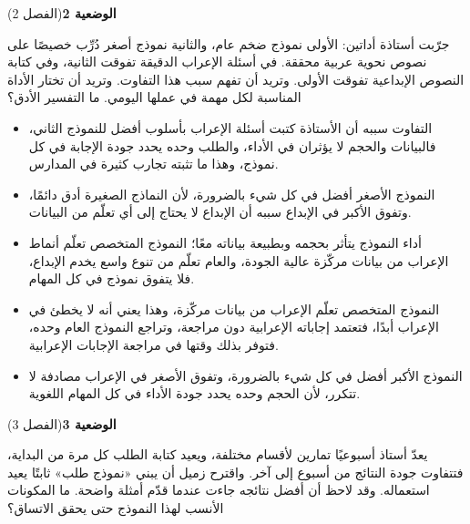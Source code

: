 \documentclass[11pt,a4paper]{article}
\begin{document}
\par\vspace{6pt}
\noindent
{\large\khatt\textbf{الوضعية 2}}\hfill{\small(الفصل 2)}\par\nopagebreak\vspace{3pt}
\setlength{\fboxsep}{7pt}\colorbox{gray!10}{\parbox{\dimexpr\linewidth-14pt}{جرّبت أستاذة أداتين: الأولى نموذج ضخم عام، والثانية نموذج أصغر دُرِّب خصيصًا على نصوص نحوية عربية محققة. في أسئلة الإعراب الدقيقة تفوقت الثانية، وفي كتابة النصوص الإبداعية تفوقت الأولى. وتريد أن تفهم سبب هذا التفاوت. وتريد أن تختار الأداة المناسبة لكل مهمة في عملها اليومي. ما التفسير الأدق؟}}\par\nopagebreak
\begin{itemize}[leftmargin=1.0cm, labelsep=6pt, itemsep=3pt, topsep=4pt, parsep=0pt]
  \item[\textbf{أ)}] التفاوت سببه أن الأستاذة كتبت أسئلة الإعراب بأسلوب أفضل للنموذج الثاني، فالبيانات والحجم لا يؤثران في الأداء، والطلب وحده يحدد جودة الإجابة في كل نموذج، وهذا ما تثبته تجارب كثيرة في المدارس.
  \item[\textbf{ب)}] النموذج الأصغر أفضل في كل شيء بالضرورة، لأن النماذج الصغيرة أدق دائمًا، وتفوق الأكبر في الإبداع سببه أن الإبداع لا يحتاج إلى أي تعلّم من البيانات.
  \item[\textbf{ج)}] أداء النموذج يتأثر بحجمه وبطبيعة بياناته معًا؛ النموذج المتخصص تعلّم أنماط الإعراب من بيانات مركّزة عالية الجودة، والعام تعلّم من تنوع واسع يخدم الإبداع، فلا يتفوق نموذج في كل المهام.
  \item[\textbf{د)}] النموذج المتخصص تعلّم الإعراب من بيانات مركّزة، وهذا يعني أنه لا يخطئ في الإعراب أبدًا، فتعتمد إجاباته الإعرابية دون مراجعة، وتراجع النموذج العام وحده، فتوفر بذلك وقتها في مراجعة الإجابات الإعرابية.
  \item[\textbf{هـ)}] النموذج الأكبر أفضل في كل شيء بالضرورة، وتفوق الأصغر في الإعراب مصادفة لا تتكرر، لأن الحجم وحده يحدد جودة الأداء في كل المهام اللغوية.
\end{itemize}
\par\vspace{6pt}
\noindent
{\large\khatt\textbf{الوضعية 3}}\hfill{\small(الفصل 3)}\par\nopagebreak\vspace{3pt}
\setlength{\fboxsep}{7pt}\colorbox{gray!10}{\parbox{\dimexpr\linewidth-14pt}{يعدّ أستاذ أسبوعيًا تمارين لأقسام مختلفة، ويعيد كتابة الطلب كل مرة من البداية، فتتفاوت جودة النتائج من أسبوع إلى آخر. واقترح زميل أن يبني «نموذج طلب» ثابتًا يعيد استعماله. وقد لاحظ أن أفضل نتائجه جاءت عندما قدّم أمثلة واضحة. ما المكونات الأنسب لهذا النموذج حتى يحقق الاتساق؟}}\par\nopagebreak
\end{document}
